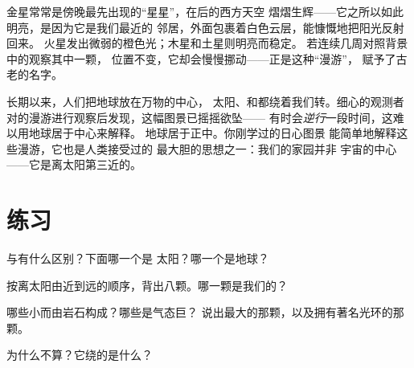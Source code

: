 \begin{example}[天空中的漫游者]\label{ex:g4:solar-system:wanderers}
金星常常是傍晚最先出现的“星星”，在后的西方天空
熠熠生辉——它之所以如此明亮，是因为它是我们最近的
邻居，外面包裹着白色云层，能慷慨地把阳光反射回来。
火星发出微弱的橙色光；木星和土星则明亮而稳定。
若连续几周对照背景中的观察其中一颗，
位置不变，它却会慢慢挪动——正是这种“漫游”，
赋予了古老的名字。
\end{example}

\begin{remark}[一幅旧图的重绘]\label{rem:g4:solar-system:history}
长期以来，人们把地球放在万物的中心，
太阳、和都绕着我们转。细心的观测者
对的漫游进行观察后发现，这幅图景已摇摇欲坠——
有时会\emph{逆行}一段时间，这难以用地球居于中心来解释。
地球居于正中。你刚学过的日心图景
能简单地解释这些漫游，它也是人类接受过的
最大胆的思想之一：我们的家园并非
宇宙的中心——它是离太阳第三近的。
\end{remark}

\section{练习}

\begin{exercise}[$\star$]\label{exo:g4:solar-system:1}
与有什么区别？下面哪一个是
太阳？哪一个是地球？
\end{exercise}

\begin{exercise}[$\star$]\label{exo:g4:solar-system:2}
按离太阳由近到远的顺序，背出八颗。哪一颗是我们的？
\end{exercise}

\begin{exercise}[$\star$]\label{exo:g4:solar-system:3}
哪些小而由岩石构成？哪些是气态巨？
说出最大的那颗，以及拥有著名光环的那颗。
\end{exercise}

\begin{exercise}[$\star$]\label{exo:g4:solar-system:4}
为什么不算？它绕的是什么？
\end{exercise}

